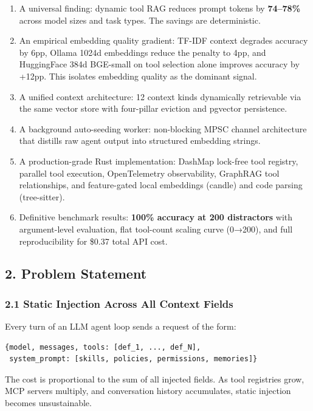 \documentclass[
  10pt,
]{article}
\begin{document}
\begin{enumerate}
\def\labelenumi{\arabic{enumi}.}
\item
  A universal finding: dynamic tool RAG reduces prompt tokens by
  \textbf{74--78\%} across model sizes and task types. The savings are
  deterministic.
\item
  An empirical embedding quality gradient: TF-IDF context degrades
  accuracy by 6pp, Ollama 1024d embeddings reduce the penalty to 4pp,
  and HuggingFace 384d BGE-small on tool selection alone improves
  accuracy by +12pp. This isolates embedding quality as the dominant
  signal.
\item
  A unified context architecture: 12 context kinds dynamically
  retrievable via the same vector store with four-pillar eviction and
  pgvector persistence.
\item
  A background auto-seeding worker: non-blocking MPSC channel
  architecture that distills raw agent output into structured embedding
  strings.
\item
  A production-grade Rust implementation: DashMap lock-free tool
  registry, parallel tool execution, OpenTelemetry observability,
  GraphRAG tool relationships, and feature-gated local embeddings
  (candle) and code parsing (tree-sitter).
\item
  Definitive benchmark results: \textbf{100\% accuracy at 200
  distractors} with argument-level evaluation, flat tool-count scaling
  curve (0→200), and full reproducibility for \$0.37 total API cost.
\end{enumerate}

\subsection{2. Problem Statement}\label{problem-statement}

\subsubsection{2.1 Static Injection Across All Context
Fields}\label{static-injection-across-all-context-fields}

Every turn of an LLM agent loop sends a request of the form:

\begin{verbatim}
{model, messages, tools: [def_1, ..., def_N],
 system_prompt: [skills, policies, permissions, memories]}
\end{verbatim}

The cost is proportional to the sum of all injected fields. As tool
registries grow, MCP servers multiply, and conversation history
accumulates, static injection becomes unsustainable.
\end{document}
